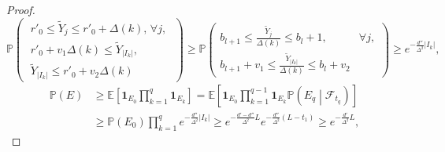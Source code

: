 \begin{proof}
{    }
    \begin{equation*}
        \mathbb P\left(\;
            \begin{aligned}
                r'_0\le \tilde Y_j\le r'_0+\Delta(k),\,
                \forall j,\\
                r'_0+v_1\Delta(k)\le \tilde Y_{|I_k|},\\
                \tilde Y_{|I_k|}\le r'_0+v_2\Delta(k)
            \end{aligned}
        \;\right)
        \ge
        \mathbb P\left(
            \begin{aligned}
                b_{l+1}\le\frac{\tilde Y_j}{\Delta(k)}\le b_l+1,\quad&\forall j,\\
                b_{l+1}+v_1\le\frac{\tilde Y_{|I_k|}}{\Delta(k)}\le b_l+v_2
            \end{aligned}
        \right)
        \ge
        e^{
            -\frac{d''}{\Delta^2}|I_k|
        },
    \end{equation*}
    \begin{align*}
        \mathbb{P}(E)
        &\ge
        \mathbb E\left[
            \mathbf 1_{E_0} \prod_{k=1}^{q} \mathbf 1_{E_k}
        \right]
        =
        \mathbb E\left[
            \mathbf 1_{E_0} \prod_{k=1}^{q-1} \mathbf 1_{E_k}
            \mathbb P\left(E_q \middle| \mathcal F_{t_q}\right)
        \right]
        \\
        &
        \ge \mathbb{P}(E_0) \prod_{k=1}^{q} e^{-\frac{d''}{\Delta^2}|I_k|}
        \ge e^{-\frac{d' - d''}{\Delta^2}L} e^{-\frac{d''}{\Delta^2}(L-t_1)}
        \ge e^{-\frac{d'}{\Delta^2}L},
    \end{align*}
    \qedhere
\end{proof}
